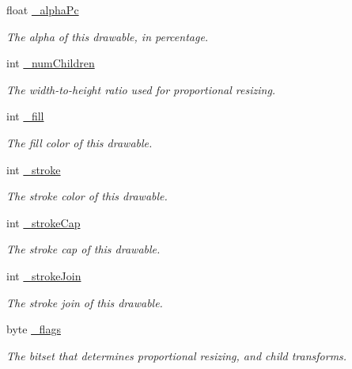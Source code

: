 \begin{DoxyCompactItemize}
float \hyperlink{classhype_1_1core_1_1drawable_1_1_h_drawable_a7aafa34986a8a27053d5298608b53a94}{\-\_\-alpha\-Pc}
\begin{DoxyCompactList}\small\item\em The alpha of this drawable, in percentage. \end{DoxyCompactList}\item 
int \hyperlink{classhype_1_1core_1_1drawable_1_1_h_drawable_a3d2ec798d880968b25a5c81a8dd31357}{\-\_\-num\-Children}
\begin{DoxyCompactList}\small\item\em The width-\/to-\/height ratio used for proportional resizing. \end{DoxyCompactList}\item 
int \hyperlink{classhype_1_1core_1_1drawable_1_1_h_drawable_a5f07bd6382bd895ca51c51a2285a31dc}{\-\_\-fill}
\begin{DoxyCompactList}\small\item\em The fill color of this drawable. \end{DoxyCompactList}\item 
int \hyperlink{classhype_1_1core_1_1drawable_1_1_h_drawable_aa773c8e474774a4f4b6437f77abdc85b}{\-\_\-stroke}
\begin{DoxyCompactList}\small\item\em The stroke color of this drawable. \end{DoxyCompactList}\item 
int \hyperlink{classhype_1_1core_1_1drawable_1_1_h_drawable_a35be29f7a889fada5549c5dfcaa98d7d}{\-\_\-stroke\-Cap}
\begin{DoxyCompactList}\small\item\em The stroke cap of this drawable. \end{DoxyCompactList}\item 
int \hyperlink{classhype_1_1core_1_1drawable_1_1_h_drawable_a3b021f60cc0552c6d1c5d4e298419dec}{\-\_\-stroke\-Join}
\begin{DoxyCompactList}\small\item\em The stroke join of this drawable. \end{DoxyCompactList}\item 
\hypertarget{classhype_1_1core_1_1drawable_1_1_h_drawable_a43f24a50f5146c4f474e94551f8ad8f1}{byte \hyperlink{classhype_1_1core_1_1drawable_1_1_h_drawable_a43f24a50f5146c4f474e94551f8ad8f1}{\-\_\-flags}}\label{classhype_1_1core_1_1drawable_1_1_h_drawable_a43f24a50f5146c4f474e94551f8ad8f1}

\begin{DoxyCompactList}\small\item\em The bitset that determines proportional resizing, and child transforms. \end{DoxyCompactList}\end{DoxyCompactItemize}


